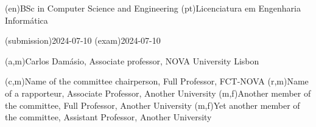\ntauthordegree(en){BSc in Computer Science and Engineering}
\ntauthordegree(pt){Licenciatura em Engenharia Informática}

\ntdate(submission){2024-07-10}
\ntdate(exam){2024-07-10}

(a,m){Carlos Damásio, Associate professor, NOVA University Lisbon}

(c,m){Name of the committee chairperson, Full Professor, FCT-NOVA}
(r,m){Name of a rapporteur, Associate Professor, Another University}
(m,f){Another member of the committee, Full Professor, Another University}
(m,f){Yet another member of the committee, Assistant Professor, Another University}
